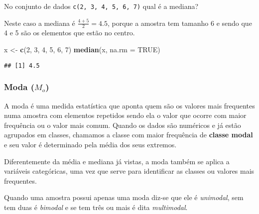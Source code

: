 \documentclass[12pt,]{style/krantz}
\makeatletter
\newenvironment{Shaded}{\begin{snugshade}}{\end{snugshade}}
\newcommand{\DataTypeTok}[1]{\textcolor[rgb]{0.13,0.29,0.53}{#1}}
\newcommand{\DecValTok}[1]{\textcolor[rgb]{0.00,0.00,0.81}{#1}}
\newcommand{\KeywordTok}[1]{\textcolor[rgb]{0.13,0.29,0.53}{\textbf{#1}}}
\newcommand{\NormalTok}[1]{#1}
\newcommand{\OperatorTok}[1]{\textcolor[rgb]{0.81,0.36,0.00}{\textbf{#1}}}
\newcommand{\OtherTok}[1]{\textcolor[rgb]{0.56,0.35,0.01}{#1}}
\newcommand{\StringTok}[1]{\textcolor[rgb]{0.31,0.60,0.02}{#1}}
\renewenvironment{quote}{\begin{VF}}{\end{VF}}
\newenvironment{kframe}{%
\medskip{}
\setlength{\fboxsep}{.8em}
 \def\at@end@of@kframe{}%
 \ifinner\ifhmode%
  \def\at@end@of@kframe{\end{minipage}}%
  \begin{minipage}{\columnwidth}%
 \fi\fi%
 \def\FrameCommand##1{\hskip\@totalleftmargin \hskip-\fboxsep
 \colorbox{shadecolor}{##1}\hskip-\fboxsep
     \hskip-\linewidth \hskip-\@totalleftmargin \hskip\columnwidth}%
 \MakeFramed {\advance\hsize-\width
   \@totalleftmargin\z@ \linewidth\hsize
   \@setminipage}}%
 {\par\unskip\endMakeFramed%
 \at@end@of@kframe}
\renewenvironment{Shaded}{\begin{kframe}}{\end{kframe}}
\theoremstyle{definition}
\theoremstyle{definition}
\theoremstyle{definition}
\theoremstyle{remark}
\let\BeginKnitrBlock\begin \let\EndKnitrBlock\end
\makeatother
\begin{document}
\BeginKnitrBlock{example}
\protect\hypertarget{exm:unnamed-chunk-42}{}{\label{exm:unnamed-chunk-42} }No conjunto de dados \texttt{c(2,\ 3,\ 4,\ 5,\ 6,\ 7)} qual é a mediana?
\EndKnitrBlock{example}

Neste caso a mediana é \(\frac{4 + 5}{2} = 4.5\), porque a amostra tem tamanho 6 e sendo que 4 e 5 são os elementos que estão no centro.

\begin{Shaded}
\begin{Highlighting}[]
\NormalTok{x <-}\StringTok{ }\KeywordTok{c}\NormalTok{(}\DecValTok{2}\NormalTok{, }\DecValTok{3}\NormalTok{, }\DecValTok{4}\NormalTok{, }\DecValTok{5}\NormalTok{, }\DecValTok{6}\NormalTok{, }\DecValTok{7}\NormalTok{)}
\KeywordTok{median}\NormalTok{(x, }\DataTypeTok{na.rm =} \OtherTok{TRUE}\NormalTok{)}
\end{Highlighting}
\end{Shaded}

\begin{verbatim}
## [1] 4.5
\end{verbatim}

\hypertarget{moda-m_o}{%
\subsubsection{\texorpdfstring{Moda (\(M_o\))}{Moda (M\_o)}}\label{moda-m_o}}

A moda é uma medida estatística que aponta quem são os valores mais frequentes numa amostra com elementos repetidos sendo ela o valor que ocorre com maior frequência ou o valor mais comum. Quando os dados são numéricos e já estão agrupados em classes, chamamos a classe com maior frequência de \textbf{classe modal} e seu valor é determinado pela média dos seus extremos.

\begin{quote}
Diferentemente da média e mediana já vistas, a moda também se aplica a variáveis categóricas, uma vez que serve para identificar as classes ou valores mais frequentes.
\end{quote}

Quando uma amostra possui apenas uma moda diz-se que ele é \emph{unimodal}, sem tem duas é \emph{bimodal} e se tem três ou mais é dita \emph{multimodal}.

\begin{Shaded}
\end{Shaded}
\end{document}
